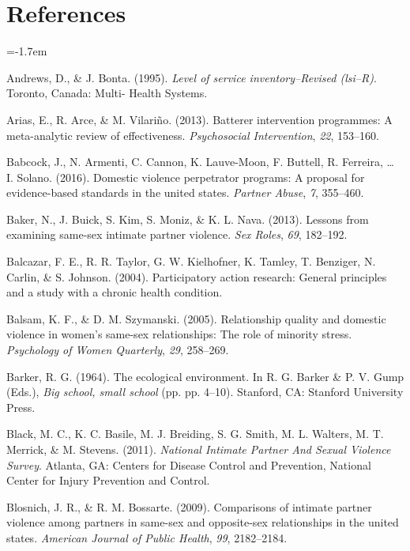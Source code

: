 \documentclass[11pt,]{tufte-book}
\newcommand{\refs}{
    \parindent=-1.7em\
    \
    \setlength{\parskip}{0.5\baselineskip}
}
\begin{document}
\part{References}

\refs

\hypertarget{refs}{}
\hypertarget{ref-andrews1994level}{}
Andrews, D., \& J. Bonta. (1995). \emph{Level of service
inventory--Revised (lsi--R)}. Toronto, Canada: Multi- Health Systems.

\hypertarget{ref-arias2013batterer}{}
Arias, E., R. Arce, \& M. Vilariño. (2013). Batterer intervention
programmes: A meta-analytic review of effectiveness. \emph{Psychosocial
Intervention}, \emph{22}, 153--160.

\hypertarget{ref-babcock2016domestic}{}
Babcock, J., N. Armenti, C. Cannon, K. Lauve-Moon, F. Buttell, R.
Ferreira, \ldots{} I. Solano. (2016). Domestic violence perpetrator
programs: A proposal for evidence-based standards in the united states.
\emph{Partner Abuse}, \emph{7}, 355--460.

\hypertarget{ref-baker2013lessons}{}
Baker, N., J. Buick, S. Kim, S. Moniz, \& K. L. Nava. (2013). Lessons
from examining same-sex intimate partner violence. \emph{Sex Roles},
\emph{69}, 182--192.

\hypertarget{ref-balcazar2004participatory}{}
Balcazar, F. E., R. R. Taylor, G. W. Kielhofner, K. Tamley, T. Benziger,
N. Carlin, \& S. Johnson. (2004). Participatory action research: General
principles and a study with a chronic health condition.

\hypertarget{ref-balsam2005relationship}{}
Balsam, K. F., \& D. M. Szymanski. (2005). Relationship quality and
domestic violence in women's same-sex relationships: The role of
minority stress. \emph{Psychology of Women Quarterly}, \emph{29},
258--269.

\hypertarget{ref-barker1964ecological}{}
Barker, R. G. (1964). The ecological environment. In R. G. Barker \& P.
V. Gump (Eds.), \emph{Big school, small school} (pp. pp. 4--10).
Stanford, CA: Stanford University Press.

\hypertarget{ref-black2011national}{}
Black, M. C., K. C. Basile, M. J. Breiding, S. G. Smith, M. L. Walters,
M. T. Merrick, \& M. Stevens. (2011). \emph{National Intimate Partner
And Sexual Violence Survey}. Atlanta, GA: Centers for Disease Control
and Prevention, National Center for Injury Prevention and Control.

\hypertarget{ref-blosnich2009comparisons}{}
Blosnich, J. R., \& R. M. Bossarte. (2009). Comparisons of intimate
partner violence among partners in same-sex and opposite-sex
relationships in the united states. \emph{American Journal of Public
Health}, \emph{99}, 2182--2184.
\end{document}
